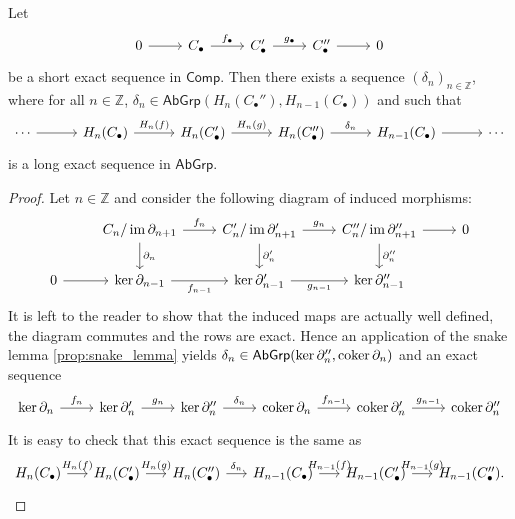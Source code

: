 \begin{proposition}
	\label{thm:les_homology}
	Let
	\begin{equation*}
		\begin{tikzcd}
			0 \arrow[r] & C_\bullet \arrow[r,"f_\bullet"] & C'_\bullet \arrow[r,"g_\bullet"] & C_\bullet'' \arrow[r] & 0
		\end{tikzcd}
	\end{equation*}
	\noindent be a short exact sequence in $\mathsf{Comp}$. Then there exists a sequence $(\delta_n)_{n \in \mathbb{Z}}$, where for all $n \in \mathbb{Z}$, $\delta_n \in \mathsf{AbGrp}(H_n(C_\bullet''),H_{n - 1}(C_\bullet))$ and such that
	\begin{equation*}
		\begin{tikzcd}[column sep=7ex]
			\cdots \arrow[r] & H_n(C_\bullet) \arrow[r,"H_n(f)"] & H_n(C'_\bullet) \arrow[r,"H_n(g)"] & H_n(C''_\bullet) \arrow[r,"\delta_n"] & H_{n - 1}(C_\bullet) \arrow[r] & \cdots
		\end{tikzcd} 
	\end{equation*}
	\noindent is a long exact sequence in $\mathsf{AbGrp}$.
\end{proposition}

\begin{proof}
	Let $n \in \mathbb{Z}$ and consider the following diagram of induced morphisms:
	\begin{equation*}
		\begin{tikzcd}
			& C_n/\im\partial_{n + 1} \arrow[r,"f_n"]\arrow[d,"\partial_n"] & C_n'/\im\partial'_{n + 1} \arrow[r,"g_n"]\arrow[d,"\partial'_n"] & C_n''/\im\partial_{n + 1}'' \arrow[r]\arrow[d,"\partial''_n"] & 0\\
			0 \arrow[r] & \ker \partial_{n - 1} \arrow[r,"f_{n - 1}"'] & \ker \partial_{n - 1}' \arrow[r,"g_{n - 1}"'] & \ker\partial_{n - 1}''
		\end{tikzcd}		
	\end{equation*}
	It is left to the reader to show that the induced maps are actually well defined, the diagram commutes and the rows are exact. Hence an application of the snake lemma \ref{prop:snake_lemma} yields $\delta_n \in \mathsf{AbGrp}(\ker \partial_n'',\operatorname{coker} \partial_n)$ and an exact sequence
	\begin{equation*}
		\begin{tikzcd}
			\ker \partial_n \arrow[r,"f_n"] & \ker \partial_n' \arrow[r,"g_n"] & \ker \partial_n'' \arrow[r,"\delta_n"] & \coker \partial_n \arrow[r,"f_{n - 1}"] & \coker \partial_n' \arrow[r,"g_{n - 1}"] & \coker \partial_n''
		 \end{tikzcd}
	\end{equation*}
	It is easy to check that this exact sequence is the same as
	\begin{equation*}
		\begin{tikzcd}[column sep=3.5ex]
			H_n(C_\bullet) \arrow[r,"H_n(f)"] & H_n(C'_\bullet) \arrow[r,"H_n(g)"] & H_n(C''_\bullet) \arrow[r,"\delta_n"] & H_{n - 1}(C_\bullet) \arrow[r,"H_{n-1}(f)"] & H_{n - 1}(C_\bullet') \arrow[r,"H_{n-1}(g)"] & H_{n - 1}(C_\bullet'').
		 \end{tikzcd}
	\end{equation*}
\end{proof}

